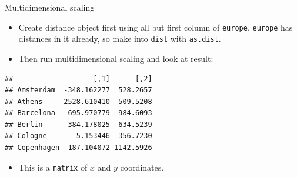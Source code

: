 \documentclass[ignorenonframetext,]{beamer}
\newenvironment{Shaded}{\begin{snugshade}}{\end{snugshade}}
\newcommand{\DecValTok}[1]{\textcolor[rgb]{0.00,0.00,0.81}{#1}}
\newcommand{\KeywordTok}[1]{\textcolor[rgb]{0.13,0.29,0.53}{\textbf{#1}}}
\newcommand{\NormalTok}[1]{#1}
\newcommand{\OperatorTok}[1]{\textcolor[rgb]{0.81,0.36,0.00}{\textbf{#1}}}
\newcommand{\StringTok}[1]{\textcolor[rgb]{0.31,0.60,0.02}{#1}}
\providecommand{\tightlist}{%
  \setlength{\itemsep}{0pt}\setlength{\parskip}{0pt}}
\begin{document}
\begin{frame}[fragile]{Multidimensional scaling}
\protect\hypertarget{multidimensional-scaling-1}{}

\begin{itemize}
\item
  Create distance object first using all but first column of
  \texttt{europe}. \texttt{europe} has distances in it already, so make
  into \texttt{dist} with \texttt{as.dist}.
\item
  Then run multidimensional scaling and look at result:
\end{itemize}

\begin{Shaded}
\end{Shaded}

\begin{verbatim}
##                   [,1]      [,2]
## Amsterdam  -348.162277  528.2657
## Athens     2528.610410 -509.5208
## Barcelona  -695.970779 -984.6093
## Berlin      384.178025  634.5239
## Cologne       5.153446  356.7230
## Copenhagen -187.104072 1142.5926
\end{verbatim}

\begin{itemize}
\tightlist
\item
  This is a \texttt{matrix} of \(x\) and \(y\) coordinates.
\end{itemize}

\end{frame}
\end{document}
